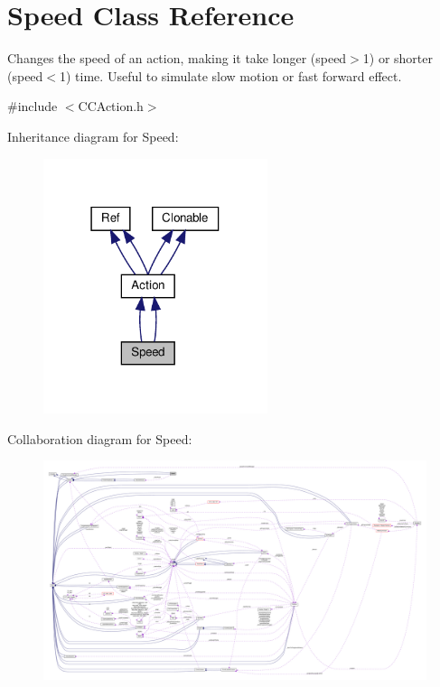 \hypertarget{classSpeed}{}\section{Speed Class Reference}
\label{classSpeed}


Changes the speed of an action, making it take longer (speed$>$1) or shorter (speed$<$1) time. Useful to simulate \textquotesingle{}slow motion\textquotesingle{} or \textquotesingle{}fast forward\textquotesingle{} effect.  




{\ttfamily \#include $<$C\+C\+Action.\+h$>$}



Inheritance diagram for Speed\+:
\nopagebreak
\begin{figure}[H]
\begin{center}
\leavevmode
\includegraphics[width=186pt]{classSpeed__inherit__graph}
\end{center}
\end{figure}


Collaboration diagram for Speed\+:
\nopagebreak
\begin{figure}[H]
\begin{center}
\leavevmode
\includegraphics[width=350pt]{classSpeed__coll__graph}
\end{center}
\end{figure}
